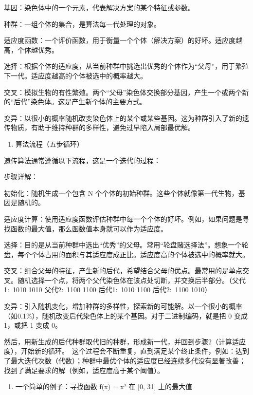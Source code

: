 基因：染色体中的一个元素，代表解决方案的某个特征或参数。

种群：一组个体的集合，是算法每一代处理的对象。

适应度函数：一个评价函数，用于衡量一个个体（解决方案）的好坏。适应度越高，个体越优秀。

选择：根据个体的适应度，从当前种群中挑选出优秀的个体作为``父母''，用于繁殖下一代。适应度越高的个体被选中的概率越大。

交叉：模拟生物的有性繁殖。两个``父母''染色体交换部分基因，产生一个或两个新的``后代''染色体。这是产生新个体的主要方式。

变异：以很小的概率随机改变染色体上的某个或某些基因。这为种群引入了新的遗传物质，有助于维持种群的多样性，避免过早陷入局部最优解。

\begin{enumerate}
\def\labelenumi{\arabic{enumi}.}
\setcounter{enumi}{1}
\tightlist
\item
  算法流程（五步循环）
\end{enumerate}

遗传算法通常遵循以下流程，这是一个迭代的过程：

步骤详解：

初始化：随机生成一个包含 N 个个体的初始种群。这些个体就像第一代生物，基因是随机的。

适应度计算：使用适应度函数评估种群中每一个个体的好坏。例如，如果问题是寻找函数的最大值，那么函数值本身就可以作为适应度。

选择：目的是从当前种群中选出``优秀''的父母。常用``轮盘赌选择法''。想象一个轮盘，每个个体占用的面积与其适应度成正比。适应度高的个体被选中的概率就大。

交叉：组合父母的特征，产生新的后代，希望结合父母的优点。最常用的是单点交叉。随机选择一个点，将两个父代染色体在该点处切断，并交换后半部分。（父代1:~1010 \textbar{} 1010 父代2:~1100 \textbar{} 1100 后代1:~1010 1100 后代2:~1100 1010）

变异：引入随机变化，增加种群的多样性，探索新的可能解。以一个很小的概率（如0.1\%），随机改变后代染色体上的某个基因。对于二进制编码，就是把 0 变成 1，或把 1 变成 0。

然后，用新生成的后代种群取代旧的种群，形成新一代，并回到步骤2（计算适应度），开始新的循环。~这个过程会不断重复，直到满足某个终止条件，例如：达到了最大迭代次数（代数）；种群中最优个体的适应度已经连续多代没有显著改善；找到了满足要求的解（例如，适应度高于某个阈值）。

\begin{enumerate}
\def\labelenumi{\arabic{enumi}.}
\setcounter{enumi}{2}
\tightlist
\item
  一个简单的例子：寻找函数 f(x) = x² 在 {[}0, 31{]} 上的最大值
\end{enumerate}

